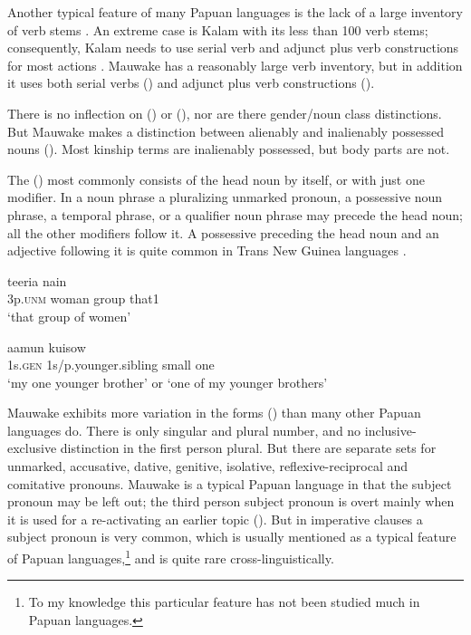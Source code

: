 Another typical feature of many Papuan languages is the lack of a large inventory of verb stems \citep[127]{Foley1986}. An extreme case is Kalam with its less than 100 verb stems; consequently, Kalam needs to use serial verb and adjunct plus verb constructions for most actions \citep[336--337]{Pawley1987}. Mauwake has a reasonably large verb inventory, but in addition it uses both serial verbs () and adjunct plus verb constructions ().

There is no inflection on  () or (), nor are there gender/noun class distinctions. But Mauwake makes a distinction between alienably and inalienably possessed nouns ().  Most kinship terms are inalienably possessed, but body parts are not.

The  () most commonly consists of the head noun by itself, or with just one modifier.  In a noun phrase a pluralizing  unmarked pronoun, a possessive noun phrase, a temporal phrase, or a qualifier noun phrase may precede the head noun; all the other modifiers follow it. A possessive preceding the head noun and an adjective following it  is quite common in Trans New Guinea languages \citep[19]{Reesink1987}. 

\ea%
\label{ex:1:x658}
\gll {}   teeria  nain \\
 3p.\textsc{unm}  woman  group  that1     \\
\glt `that group of women'
\z


\ea%
\label{ex:1:x660}
\gll {}  aamun    kuisow \\
 1s.\textsc{gen}  1s/p.younger.sibling  small  one     \\
\glt`my one younger brother' or `one of my younger brothers'
\z


Mauwake exhibits more variation in the  forms () than many other Papuan languages do.  There is only singular and plural number, and no inclusive-exclusive distinction in the first person plural.  But there are separate sets for unmarked, accusative, dative, genitive, isolative, reflexive-reciprocal and comitative pronouns.  Mauwake is a typical Papuan language in that the subject pronoun may be left out; the third person subject pronoun is overt  mainly when it is used for a re-activating an earlier topic ().  But in imperative clauses a subject pronoun is very common, which is  usually mentioned as a typical feature of Papuan languages,\footnote{To my knowledge this particular feature has not been studied much in Papuan languages.}  and is quite rare cross-linguistically.

